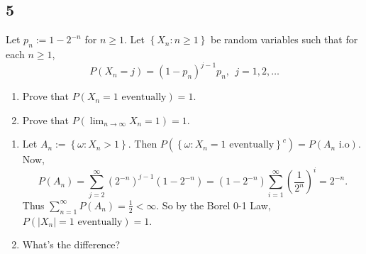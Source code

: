 \documentclass[12pt]{article}
\begin{document}
\subsection*{5}
\begin{tcolorbox}
Let $p_{n} := 1 - 2^{-n}$ for $n \geq 1$. Let $\left\{ X_{n} : n\geq 1 \right\}$ be random variables such that for each $n \geq 1$,
\[ P(X_{n} = j) = (1 - p_{n})^{j-1}p_{n}, \ \ j = 1, 2, \hdots \]
\begin{enumerate}[label=(\alph*)]
\item Prove that $P(X_{n} = 1 \text{ eventually}) = 1$.
\item Prove that $P(\lim_{n\rightarrow\infty} X_{n} = 1) = 1$.
\end{enumerate}
\end{tcolorbox}
\begin{enumerate}[label=(\alph*)]
\item Let $A_{n} := \left\{ \omega : X_{n} > 1 \right\}$. Then 
$P\left( \left\{ \omega : X_{n} = 1 \text{ eventually}\right\}^{c} \right) = P\left( A_{n} \text{ i.o} \right)$. Now,
\[ P(A_{n}) = \sum_{j=2}^{\infty}(2^{-n})^{j-1}(1-2^{-n}) = (1-2^{-n})\sum_{i=1}^{\infty}\left( \frac{1}{2^{n}} \right)^{i} = 2^{-n}. \]
Thus $\sum_{n=1}^{\infty}P(A_{n}) = \frac{1}{2} < \infty$. So by the Borel 0-1 Law, $P(|X_{n}| = 1 \text{ eventually}) = 1$.
\item What's the difference?
\end{enumerate}
\end{document}
